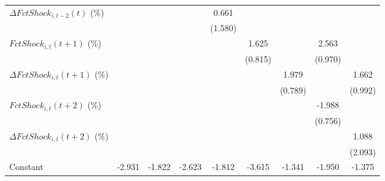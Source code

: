 {\begin{tabular}{l*{8}{c}}
\addlinespace
$ \Delta FctShock_{i,t-2}(t)$ (\%)&                     &                     &                     &       0.661         &                     &                     &                     &                     \\
                    &                     &                     &                     &     (1.580)         &                     &                     &                     &                     \\
\addlinespace
$ FctShock_{i,t}(t+1)$ (\%)&                     &                     &                     &                     &       1.625\sym{*}  &                     &       2.563\sym{**} &                     \\
                    &                     &                     &                     &                     &     (0.815)         &                     &     (0.970)         &                     \\
\addlinespace
$ \Delta FctShock_{i,t}(t+1)$ (\%)&                     &                     &                     &                     &                     &       1.979\sym{**} &                     &       1.662         \\
                    &                     &                     &                     &                     &                     &     (0.789)         &                     &     (0.992)         \\
\addlinespace
$ FctShock_{i,t}(t+2)$ (\%)&                     &                     &                     &                     &                     &                     &      -1.988\sym{**} &                     \\
                    &                     &                     &                     &                     &                     &                     &     (0.756)         &                     \\
\addlinespace
$ \Delta FctShock_{i,t}(t+2)$ (\%)&                     &                     &                     &                     &                     &                     &                     &       1.088         \\
                    &                     &                     &                     &                     &                     &                     &                     &     (2.093)         \\
\addlinespace
Constant            &      -2.931\sym{***}&      -1.822\sym{***}&      -2.623\sym{**} &      -1.812\sym{***}&      -3.615\sym{***}&      -1.341\sym{***}&      -1.950\sym{*}  &      -1.375\sym{***}\\

\end{tabular}}

